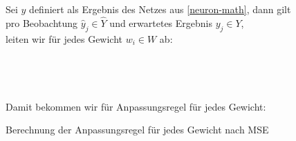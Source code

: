                 \begin{figure}[H]
                    \begin{mdframed}
                        \noindent
                        Sei $\widehat{y}$ definiert als Ergebnis des Netzes aus \ref{neuron-math}, dann gilt \\
                        pro Beobachtung $\widehat{y}_j \in \widehat{Y}$ und erwartetes Ergebnis $y_j \in Y$, \\
                        leiten wir für jedes Gewicht $w_i \in W$ ab:\\[4mm]
    \hspace*{40mm}  \\[2mm]
    \hspace*{62.3mm}  \\[2mm]
    \hspace*{62.3mm}  \\[2mm]
    \hspace*{62.3mm} \\[4mm]
                        Damit bekommen wir für Anpassungsregel für jedes Gewicht:\\[4mm]
                        \hspace*{40mm} 
                    \end{mdframed}
                    \formforfigure
                    \caption{\label{derivative} Berechnung der Anpassungsregel für jedes Gewicht nach MSE}
                \end{figure}


